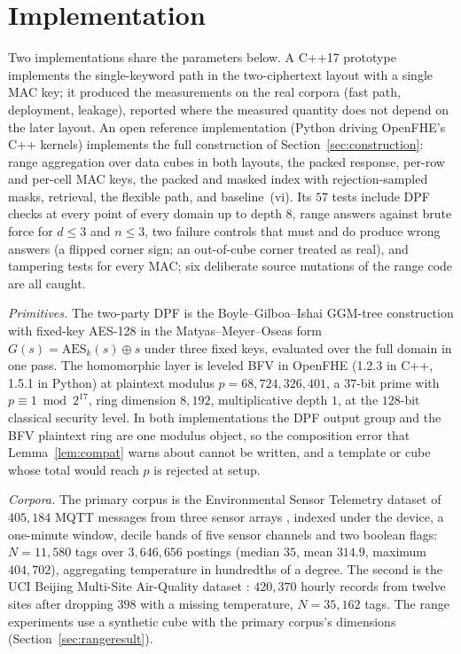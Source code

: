 \documentclass[a4paper,fleqn]{cas-sc}
\newif\ifauthorchecks
\newcommand{\authorcheck}[1]{\ifauthorchecks{\color{red}\textsf{[Authors: #1]}}\fi}
\begin{document}
\section{Implementation}
\label{sec:impl}
Two implementations share the parameters below. A C++17 prototype implements
the single-keyword path in the two-ciphertext layout with a single MAC key; it
produced the measurements on the real corpora (fast path, deployment, leakage),
reported where the measured quantity does not depend on the later layout.
\authorcheck{Publish the C++ prototype next to the reference implementation,
and re-measure in it the items marked below.} An open reference implementation
(Python driving OpenFHE's C++ kernels) implements the full construction of
Section~\ref{sec:construction}: range aggregation over data cubes in both
layouts, the packed response, per-row and per-cell MAC keys, the packed and
masked index with rejection-sampled masks, retrieval, the flexible path, and
baseline~(vi). Its $57$ tests include DPF checks at every point of every
domain up to depth $8$, range answers against brute force for $d\le3$ and
$n\le3$, two failure controls that must and do produce wrong answers (a flipped
corner sign; an out-of-cube corner treated as real), and tampering tests for
every MAC; six deliberate source mutations of the range code are all caught.

\emph{Primitives.} The two-party DPF is the Boyle--Gilboa--Ishai GGM-tree
construction \citep{boyle2016function} with fixed-key AES-128 in the
Matyas--Meyer--Oseas form $G(s)=\mathrm{AES}_k(s)\oplus s$ under three fixed
keys, evaluated over the full domain in one pass. The homomorphic layer is
leveled BFV in OpenFHE \citep{openfhe} (1.2.3 in C++, 1.5.1 in Python) at
plaintext modulus $p=68{,}724{,}326{,}401$, a $37$-bit prime with $p\equiv1
\bmod 2^{17}$, ring dimension $8{,}192$, multiplicative depth $1$, at the
$128$-bit classical security level. In both implementations the DPF output
group and the BFV plaintext ring are one modulus object, so the composition
error that Lemma~\ref{lem:compat} warns about cannot be written, and a
template or cube whose total would reach $p$ is rejected at setup.

\emph{Corpora.} The primary corpus is the Environmental Sensor Telemetry
dataset of $405{,}184$ MQTT messages from three sensor arrays
\citep{stafford_2020_environmental}, indexed under the device, a one-minute
window, decile bands of five sensor channels and two boolean flags:
$N=11{,}580$ tags over $3{,}646{,}656$ postings (median $35$, mean $314.9$,
maximum $404{,}702$), aggregating temperature in hundredths of a degree. The
second is the UCI Beijing Multi-Site Air-Quality dataset
\citep{zhang2017cautionary,chen2019beijing}: $420{,}370$ hourly records from
twelve sites after dropping $398$ with a missing temperature, $N=35{,}162$
tags. The range experiments use a synthetic cube with the primary corpus's
dimensions (Section~\ref{sec:rangeresult}).
\end{document}
